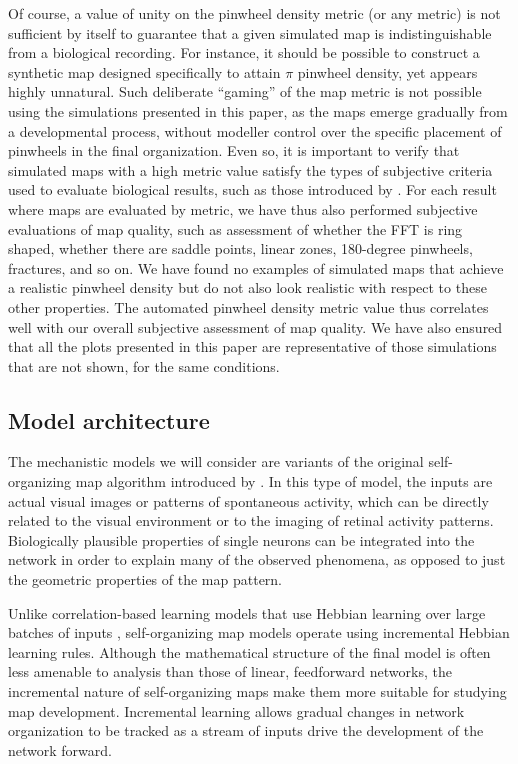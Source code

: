 \documentclass{article}
\begin{document}
Of course, a value of unity on the pinwheel density metric
(or any metric) is not sufficient by itself to guarantee that a
given simulated map is indistinguishable from a biological
recording. For instance, it should be possible to construct a
synthetic map designed specifically to attain $\pi$ pinwheel
density, yet appears highly unnatural. Such deliberate ``gaming'' of
the map metric is not possible using the simulations presented in
this paper, as the maps emerge gradually from a developmental
process, without modeller control over the specific placement of
pinwheels in the final organization. Even so, it is important to
verify that simulated maps with a high metric value satisfy the
types of subjective criteria used to evaluate biological results,
such as those introduced by \citet{Blasde1992b}.  For each result
where maps are evaluated by metric, we have thus also performed 
subjective evaluations of map quality, such as assessment of whether
the FFT is ring shaped, whether there are saddle points, linear
zones, 180-degree pinwheels, fractures, and so on. We have found no
examples of simulated maps that achieve a realistic pinwheel density
but do not also look realistic with respect to these other
properties. The automated pinwheel density metric value thus
correlates well with our overall subjective assessment of map
quality.  We have also ensured that all the plots presented in this
paper are representative of those simulations that are not shown,
for the same conditions.

\subsection*{Model architecture}

The mechanistic models we will consider are variants
of the original self-organizing map algorithm introduced by
\citet{vondermalsburg:selforg}. In this type of model, the inputs
are actual visual images or patterns of spontaneous activity, which
can be directly related to the visual environment or to the imaging
of retinal activity patterns. Biologically plausible properties of
single neurons can be integrated into the network in order to
explain many of the observed phenomena, as opposed to just the
geometric properties of the map pattern.

Unlike correlation-based learning models that use Hebbian learning
over large batches of inputs \citep{linsker:pnas86c,miller:model},
self-organizing map models operate using incremental Hebbian
learning rules. Although the mathematical structure of the final
model is often less amenable to analysis than those of linear,
feedforward networks, the incremental nature of self-organizing maps
make them more suitable for studying map development. Incremental
learning allows gradual changes in network organization to be
tracked as a stream of inputs drive the development of
the network forward.
\end{document}
